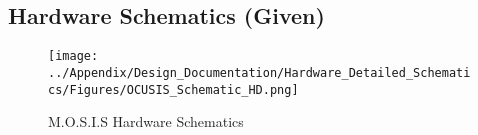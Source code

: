 \subsection{Hardware Schematics (Given)}
\begin{figure}[H]
  \begin{center}
    \texttt{[image: ../Appendix/Design\_Documentation/Hardware\_Detailed\_Schematics/Figures/OCUSIS\_Schematic\_HD.png]}
  \caption{M.O.S.I.S Hardware Schematics}
    \end{center}
\end{figure}